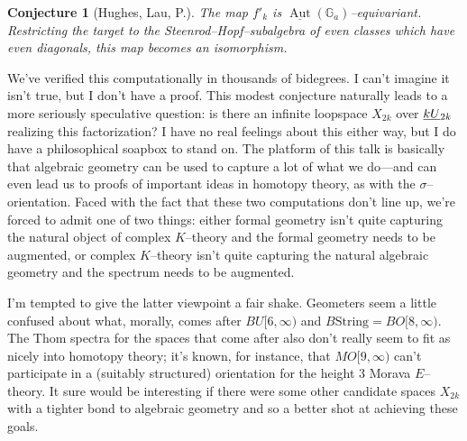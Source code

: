 \documentclass{amsart}
\newcommand{\G}{\mathbb G}
\newcommand{\<}{\langle}
\renewcommand{\>}{\rangle}
\newcommand{\OS}[2]{\smash{\underline{#1}}_{#2}}
\DeclareMathOperator{\Aut}{Aut}
\theoremstyle{plain}
\newtheorem*{conjecture}{Conjecture}
\theoremstyle{definition}
\theoremstyle{remark}
\begin{document}
\begin{conjecture}[Hughes, Lau, P.]
The map $f'_k$ is $\underline{\Aut}(\G_a)$--equivariant.  Restricting the target to the Steenrod--Hopf--subalgebra of even classes \emph{which have even diagonals}, this map becomes an isomorphism.
\end{conjecture}

\noindent We've verified this computationally in thousands of bidegrees.  I can't imagine it isn't true, but I don't have a proof.  This modest conjecture naturally leads to a more seriously speculative question: is there an infinite loopspace $X_{2k}$ over $\OS{kU}{2k}$ realizing this factorization?  I have no real feelings about this either way, but I do have a philosophical soapbox to stand on.  The platform of this talk is basically that algebraic geometry can be used to capture a lot of what we do---and can even lead us to proofs of important ideas in homotopy theory, as with the $\sigma$--orientation.  Faced with the fact that these two computations don't line up, we're forced to admit one of two things: either formal geometry isn't quite capturing the natural object of complex $K$--theory and the formal geometry needs to be augmented, or complex $K$--theory isn't quite capturing the natural algebraic geometry and the spectrum needs to be augmented.

I'm tempted to give the latter viewpoint a fair shake.  Geometers seem a little confused about what, morally, comes after $BU[6, \infty)$ and $B\mathrm{String} = BO[8, \infty)$.  The Thom spectra for the spaces that come after also don't really seem to fit as nicely into homotopy theory; it's known, for instance, that $MO[9, \infty)$ can't participate in a (suitably structured) orientation for the height $3$ Morava $E$--theory.  It sure would be interesting if there were some other candidate spaces $X_{2k}$ with a tighter bond to algebraic geometry and so a better shot at achieving these goals.
\end{document}
